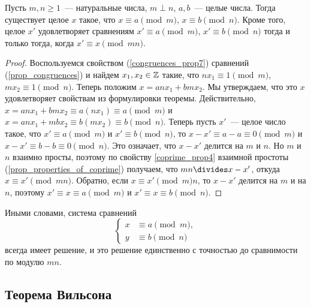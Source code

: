 \begin{theorem}\label{thm_crt}
Пусть $m, n\geq 1$~--- натуральные числа, $m\perp n$, $a,b$~--- целые
числа.
Тогда существует целое $x$ такое, что $x\equiv a\pmod
m$, $x\equiv b\pmod n$.
Кроме того, целое $x'$ удовлетворяет сравнениям $x'\equiv
a\pmod m$, $x'\equiv b\pmod n$ тогда и только тогда, когда $x'\equiv
x\pmod{mn}$.
\end{theorem}
\begin{proof}
Воспользуемся свойством (\ref{congruences_prop7}) сравнений
(\ref{prop_congruences}) и найдем $x_1,x_2\in\mathbb Z$ такие, что
$nx_1\equiv 1\pmod m$, $mx_2\equiv 1\pmod n$.
Теперь положим $x=anx_1+bmx_2$. Мы утверждаем, что это $x$
удовлетворяет свойствам из формулировки теоремы. Действительно,
$x=anx_1+bmx_2\equiv a(nx_1)\equiv a\pmod m$ и
$x=anx_1+mbx_2\equiv b(mx_2)\equiv b\pmod n$.
Теперь пусть $x'$~--- целое число такое, что $x'\equiv a\pmod m$ и
$x'\equiv b\pmod n$, то $x-x'\equiv a-a\equiv 0\pmod m$ и $x-x'\equiv
b-b\equiv 0\pmod n$. Это означает, что $x-x'$ делится на $m$ и $n$. Но
$m$ и $n$ взаимно просты, поэтому по свойству \ref{coprime_prop4}
взаимной простоты
(\ref{prop_properties_of_coprime}) получаем, что $mn\divides x-x'$,
откуда $x\equiv x'\pmod{mn}$. Обратно, если $x\equiv x'\pmod mn$, то
$x-x'$ делится на $m$ и на $n$, поэтому $x'\equiv x\equiv a\pmod m$ и
$x'\equiv x\equiv b\pmod n$.
\end{proof}

Иными словами, система сравнений
$$
\left\{
\begin{aligned}
x&\equiv a\pmod m,\\
y&\equiv b\pmod n
\end{aligned}
\right.
$$
всегда имеет решение, и это решение единственно с точностью до
сравнимости по модулю $mn$.

\subsection{Теорема Вильсона}


